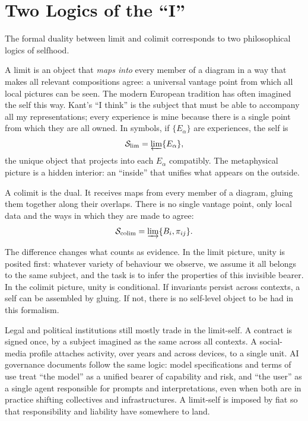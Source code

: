 \documentclass[12pt,a4paper]{article}
\begin{document}
\section{Two Logics of the ``I''}

The formal duality between limit and colimit corresponds to two philosophical logics of selfhood.

A limit is an object that \emph{maps into} every member of a diagram in a way that makes all relevant compositions agree: a universal vantage point from which all local pictures can be seen. The modern European tradition has often imagined the self this way. Kant's ``I think'' is the subject that must be able to accompany all my representations; every experience is mine because there is a single point from which they are all owned. In symbols, if $\{E_\alpha\}$ are experiences, the self is
\[
\mathcal{S}_{\mathrm{lim}} = \varprojlim \{E_\alpha\},
\]
the unique object that projects into each $E_\alpha$ compatibly. The metaphysical picture is a hidden interior: an ``inside'' that unifies what appears on the outside.

A colimit is the dual. It receives maps from every member of a diagram, gluing them together along their overlaps. There is no single vantage point, only local data and the ways in which they are made to agree:
\[
\mathcal{S}_{\mathrm{colim}} = \varinjlim \{B_i, \pi_{ij}\}.
\]

The difference changes what counts as evidence. In the limit picture, unity is posited first: whatever variety of behaviour we observe, we assume it all belongs to the same subject, and the task is to infer the properties of this invisible bearer. In the colimit picture, unity is conditional. If invariants persist across contexts, a self can be assembled by gluing. If not, there is no self-level object to be had in this formalism.

Legal and political institutions still mostly trade in the limit-self. A contract is signed once, by a subject imagined as the same across all contexts. A social-media profile attaches activity, over years and across devices, to a single unit. AI governance documents follow the same logic: model specifications and terms of use treat ``the model'' as a unified bearer of capability and risk, and ``the user'' as a single agent responsible for prompts and interpretations, even when both are in practice shifting collectives and infrastructures. A limit-self is imposed by fiat so that responsibility and liability have somewhere to land.
\end{document}
